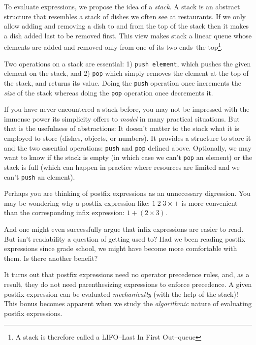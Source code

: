 \documentclass[english,smartquotes]{hgbarticle}
\begin{document}
To evaluate expressions, we propose the idea of a \emph{stack}. A stack is an abstract structure that resembles a stack of dishes we often see at restaurants. If we only allow adding and removing a dish to and from the top of the stack then it makes a dish added last to be removed first. This view makes stack a linear queue whose elements are added and removed only from one of its two ends--the top\footnote{A stack is therefore called a LIFO--Last In First Out--queue}. 

Two operations on a stack are essential: 1) \texttt{push element}, which pushes the given element on the stack, and 2) \texttt{pop} which simply removes the element at the top of the stack, and returns its value. Doing the \texttt{push} operation once increments the \emph{size} of the stack whereas doing the \texttt{pop} operation once decrements it.

If you have never encountered a stack before, you may not be impressed with the immense power its simplicity offers to \emph{model} in many practical situations. But that is the usefulness of abstractions: It doesn't matter to the stack what it is employed to store (dishes, objects, or numbers). It provides a structure to store it and the two essential operations: \texttt{push} and \texttt{pop} defined above. Optionally, we may want to know if the stack is empty (in which case we can't \texttt{pop} an element) or the stack is full (which can happen in practice where resources are limited and we can't \texttt{push} an element).

Perhaps you are thinking of postfix expressions as an unnecessary digression. You may be wondering why a postfix expression like: $1\;2\;3\times +$ is more convenient than the corresponding infix expression: $1+(2\times 3)$.

And one might even successfully argue that infix expressions are easier to read. But isn't readability a question of getting used to? Had we been reading postfix expressions since grade school, we might have become more comfortable with them. Is there another benefit? 

It turns out that postfix expressions need no operator precedence rules, and, as a result, they do not need parenthesizing expressions to enforce precedence. A given postfix expression can be evaluated \emph{mechanically} (with the help of the stack)! This bonus becomes apparent when we study the \emph{algorithmic} nature of evaluating postfix expressions. 
\end{document}
